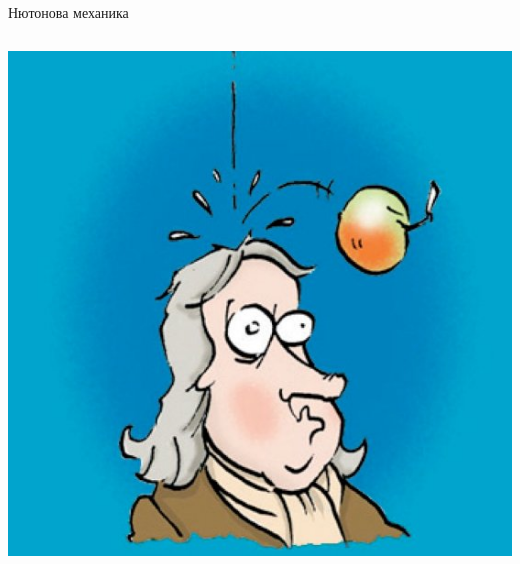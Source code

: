\documentclass[10pt,a4paper]{beamer}
\begin{document}
        \begin{frame}{ Нютонова механика }
            \begin{columns}
                \begin{column}{0.5\textwidth}
                    \includegraphics[width=\textwidth]{images/newton_apple.jpg}
                \end{column}
            \end{columns}
        \end{frame}
        
\end{document}
